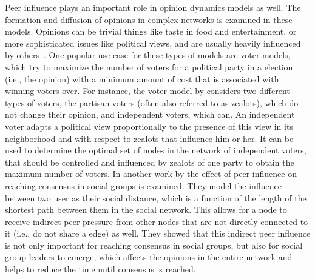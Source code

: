 Peer influence plays an important role in opinion dynamics models as well.
The formation and diffusion of opinions in complex networks is examined in these models.
Opinions can be trivial things like taste in food and entertainment, or more sophisticated issues like political views, and are usually heavily influenced by others~\cite{Acemoglu2011}.
One popular use case for these types of models are voter models, which try to maximize the number of voters for a political party in a election (i.e., the opinion) with a minimum amount of cost that is associated with winning voters over.
For instance, the voter model by \citet{Masuda2015} considers two different types of voters, the partisan voters (often also referred to as zealots), which do not change their opinion, and independent voters, which can.
An independent voter adapts a political view proportionally to the presence of this view in its neighborhood and with respect to zealots that influence him or her.
It can be used to determine the optimal set of nodes in the network of independent voters, that should be controlled and influenced by zealots of one party to obtain the maximum number of voters.
In another work by \citet{Estrada2013} the effect of peer influence on reaching consensus in social groups is examined.
They model the influence between two user as their social distance, which is a function of the length of the shortest path between them in the social network.
This allows for a node to receive indirect peer pressure from other nodes that are not directly connected to it (i.e., do not share a edge) as well.
They showed that this indirect peer influence is not only important for reaching consensus in social groups, but also for social group leaders to emerge, which affects the opinions in the entire network and helps to reduce the time until consensus is reached.

